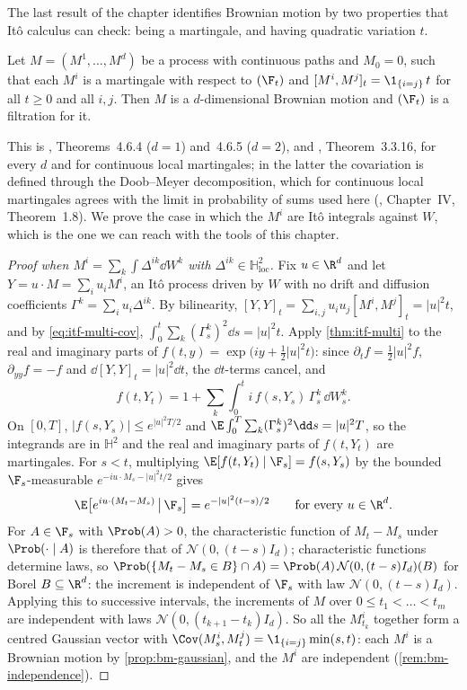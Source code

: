 The last result of the chapter identifies Brownian motion by two properties that It\^o calculus can
check: being a martingale, and having quadratic variation $t$.

\begin{theorem}\label{thm:itf-levy}
Let $M=(M^1,\dots,M^d)$ be a process with continuous paths and $M_0=0$, such that each $M^i$ is a
martingale with respect to $(\F_t)$ and $[M^i,M^j]_t=\1_{\{i=j\}}\,t$ for all $t\ge0$ and all $i,j$. Then
$M$ is a $d$-dimensional Brownian motion and $(\F_t)$ is a filtration for it.
\end{theorem}

This is \textcite{shreve2}, Theorems~4.6.4 ($d=1$) and~4.6.5 ($d=2$), and
\textcite{karatzas-shreve}, Theorem~3.3.16, for every $d$ and for continuous local martingales; in the
latter the covariation is defined through the Doob--Meyer decomposition, which for continuous local
martingales agrees with the limit in probability of sums used here (\textcite{revuz-yor}, Chapter~IV,
Theorem~1.8). We prove the case in which the $M^i$ are It\^o integrals
against $W$, which is the one we can reach with the tools of this chapter.

\begin{proof}[Proof when $M^i=\sum_k\int\Delta^{ik}\dd W^k$ with $\Delta^{ik}\in\mathbb H^2_{\mathrm{loc}}$]
Fix $u\in\R^d$ and let $Y=u\cdot M=\sum_iu_iM^i$, an It\^o process driven by $W$ with no drift and
diffusion coefficients $\Gamma^k=\sum_iu_i\Delta^{ik}$. By bilinearity,
$[Y,Y]_t=\sum_{i,j}u_iu_j[M^i,M^j]_t=|u|^2t$, and by \eqref{eq:itf-multi-cov},
$\int_0^t\sum_k(\Gamma^k_s)^2\dd s=|u|^2t$. Apply \cref{thm:itf-multi} to the real and imaginary parts
of $f(t,y)=\exp\big(iy+\frac12|u|^2t\big)$: since $\partial_tf=\frac12|u|^2f$, $\partial_{yy}f=-f$ and
$\dd[Y,Y]_t=|u|^2\dd t$, the $\dd t$-terms cancel, and
\[
  f(t,Y_t)=1+\sum_k\int_0^ti\,f(s,Y_s)\,\Gamma^k_s\,\dd W^k_s .
\]
On $[0,T]$, $|f(s,Y_s)|\le e^{|u|^2T/2}$ and $\E\int_0^T\sum_k(\Gamma^k_s)^2\dd s=|u|^2T$, so the
integrands are in $\mathbb H^2$ and the real and imaginary parts of $f(t,Y_t)$ are martingales. For
$s<t$, multiplying $\E[f(t,Y_t)\mid\F_s]=f(s,Y_s)$ by the bounded $\F_s$-measurable
$e^{-iu\cdot M_s-|u|^2t/2}$ gives
\[
  \E\big[e^{iu\cdot(M_t-M_s)}\,\big|\,\F_s\big]=e^{-|u|^2(t-s)/2}\qquad\text{for every }u\in\R^d .
\]
For $A\in\F_s$ with $\Prob(A)>0$, the characteristic function of $M_t-M_s$ under $\Prob(\cdot\mid A)$
is therefore that of $\mathcal N(0,(t-s)I_d)$; characteristic functions determine laws, so
$\Prob(\{M_t-M_s\in B\}\cap A)=\Prob(A)\,\mathcal N(0,(t-s)I_d)(B)$ for Borel $B\subseteq\R^d$: the
increment is independent of $\F_s$ with law $\mathcal N(0,(t-s)I_d)$. Applying this to successive
intervals, the increments of $M$ over $0\le t_1<\dots<t_m$ are independent with laws
$\mathcal N(0,(t_{k+1}-t_k)I_d)$. So all the $M^i_{t_k}$ together form a centred Gaussian vector with
$\Cov(M^i_s,M^j_t)=\1_{\{i=j\}}\min(s,t)$: each $M^i$ is a Brownian motion by
\cref{prop:bm-gaussian}, and the $M^i$ are independent (\cref{rem:bm-independence}).
\end{proof}

